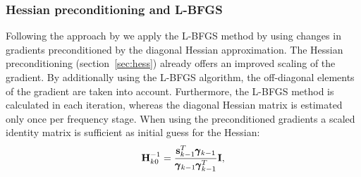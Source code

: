 \subsubsection{Hessian preconditioning and L-BFGS}
Following the approach by \cite{Bro11} we apply the L-BFGS method by using changes in gradients preconditioned by the diagonal Hessian approximation. The Hessian preconditioning (section~\ref{sec:hess}) already offers an improved scaling of the gradient. By additionally using the L-BFGS algorithm, the off-diagonal elements of the gradient are taken into account. Furthermore, the L-BFGS method is calculated in each iteration, whereas the diagonal Hessian matrix is estimated only once per frequency stage. When using the preconditioned gradients a scaled identity matrix \citep{Noc99} is sufficient as initial guess for the Hessian:
\begin{equation} \textbf H_{k0}^{-1}=\frac{\textbf s_{k-1}^T\pmb{\gamma}_{k-1}}{\pmb{\gamma}_{k-1}\pmb{\gamma}_{k-1}^T}\textbf I,  \end{equation}
